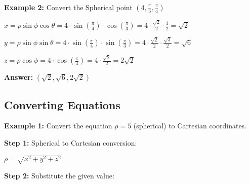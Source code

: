 \documentclass[10pt]{article}                               %
\begin{document}
\begin{adjustwidth}{2em}{0pt}
\begin{adjustwidth}{2em}{0pt}
\begin{examplebox}
                \textbf{Example 2:} Convert the Spherical point \( \left(4, \frac{\pi}{3}, \frac{\pi}{4}\right) \)
                \vspace{0.5em}

                \begin{adjustwidth}{2em}{0pt}

                    \( x = \rho\sin\phi\cos\theta = 4 \cdot \sin\left(\frac{\pi}{4}\right) \cdot \cos\left(\frac{\pi}{3}\right) = 4 \cdot \frac{\sqrt{2}}{2} \cdot \frac{1}{2} = \sqrt{2} \)

                    \( y = \rho\sin\phi\sin\theta = 4 \cdot \sin\left(\frac{\pi}{4}\right) \cdot \sin\left(\frac{\pi}{3}\right) = 4 \cdot \frac{\sqrt{2}}{2} \cdot \frac{\sqrt{3}}{2} = \sqrt{6} \)

                    \( z = \rho\cos\phi = 4 \cdot \cos\left(\frac{\pi}{4}\right) = 4 \cdot \frac{\sqrt{2}}{2} = 2\sqrt{2} \)

                    \textbf{Answer:} \( \left(\sqrt{2}, \sqrt{6}, 2\sqrt{2}\right) \)

                \end{adjustwidth}

            \end{examplebox}

            \begin{examplebox}
        
                \subsection*{Converting Equations}
            
                \textbf{Example 1:} Convert the equation \( \rho = 5 \) (spherical) to Cartesian coordinates.
                \vspace{0.5em}
            
                \begin{adjustwidth}{2em}{0pt}
            
                    \textbf{Step 1:} Spherical to Cartesian conversion:
            
                    \vspace{0.25em}
            
                    \( \rho = \sqrt{x^2 + y^2 + z^2} \)
            
                    \vspace{0.5em}
            
                    \textbf{Step 2:} Substitute the given value:
            

\end{adjustwidth}
\end{examplebox}
\end{adjustwidth}
\end{adjustwidth}
\end{document}
